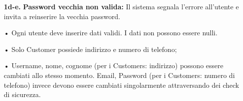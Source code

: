 \documentclass{article}
\begin{document}
{\begin{enumerate}[nosep, leftmargin=25px]
			\begin{enumerate}[nosep, leftmargin=1px]
				\item[i.] L'utente naviga su "Cambia password"; 
				\item[ii.] Il sistema mostra una pagina dedicata per il cambio password;
				\item[iii.] L'utente inserisce la nuova e la vecchia password;
				\item[iv.] Il sistema verifica la password vecchia;
				\item[v.] Il sistema aggiorna la password nel database e mostra un messaggio di conferma all'utente.
			\end{enumerate}
			\item[\textbf{1d-e.}] \textbf{Password vecchia non valida:} Il sistema segnala l'errore all'utente e invita a reinserire la vecchia password.
		\end{enumerate}
	}
	{
		\begin{enumerate}[nosep, leftmargin=*]
			\item[•] Ogni utente deve inserire dati validi. I dati non possono essere nulli.
			\item[•] Solo Customer possiede indirizzo e numero di telefono;
			\item[•] Username, nome, cognome (per i Customers: indirizzo) possono essere cambiati allo stesso momento. Email, Password (per i Customers: numero di telefono) invece devono essere cambiati singolarmente attraversando dei check di sicurezza.
		\end{enumerate}
	}
	
	\newpage
	
\end{document}
